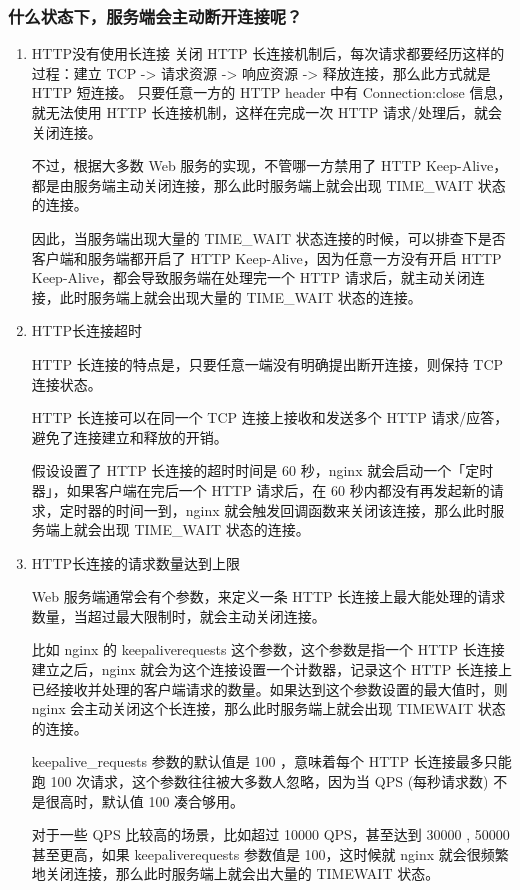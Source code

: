 \documentclass[11pt]{article}
\begin{document}
\subsubsection{什么状态下，服务端会主动断开连接呢？}
\label{sec:org2417e2a}
\begin{enumerate}
\item HTTP没有使用长连接
关闭 HTTP 长连接机制后，每次请求都要经历这样的过程：建立 TCP -> 请求资源 -> 响应资源 -> 释放连接，那么此方式就是 HTTP 短连接。
只要任意一方的 HTTP header 中有 Connection:close 信息，就无法使用 HTTP 长连接机制，这样在完成一次 HTTP 请求/处理后，就会关闭连接。

不过，根据大多数 Web 服务的实现，不管哪一方禁用了 HTTP Keep-Alive，都是由服务端主动关闭连接，那么此时服务端上就会出现 TIME\_WAIT 状态的连接。

因此，当服务端出现大量的 TIME\_WAIT 状态连接的时候，可以排查下是否客户端和服务端都开启了 HTTP Keep-Alive，因为任意一方没有开启 HTTP Keep-Alive，都会导致服务端在处理完一个 HTTP 请求后，就主动关闭连接，此时服务端上就会出现大量的 TIME\_WAIT 状态的连接。

\item HTTP长连接超时

HTTP 长连接的特点是，只要任意一端没有明确提出断开连接，则保持 TCP 连接状态。

HTTP 长连接可以在同一个 TCP 连接上接收和发送多个 HTTP 请求/应答，避免了连接建立和释放的开销。

假设设置了 HTTP 长连接的超时时间是 60 秒，nginx 就会启动一个「定时器」，如果客户端在完后一个 HTTP 请求后，在 60 秒内都没有再发起新的请求，定时器的时间一到，nginx 就会触发回调函数来关闭该连接，那么此时服务端上就会出现 TIME\_WAIT 状态的连接。

\item HTTP长连接的请求数量达到上限

Web 服务端通常会有个参数，来定义一条 HTTP 长连接上最大能处理的请求数量，当超过最大限制时，就会主动关闭连接。

比如 nginx 的 keepaliverequests 这个参数，这个参数是指一个 HTTP 长连接建立之后，nginx 就会为这个连接设置一个计数器，记录这个 HTTP 长连接上已经接收并处理的客户端请求的数量。如果达到这个参数设置的最大值时，则 nginx 会主动关闭这个长连接，那么此时服务端上就会出现 TIMEWAIT 状态的连接。

keepalive\_requests 参数的默认值是 100 ，意味着每个 HTTP 长连接最多只能跑 100 次请求，这个参数往往被大多数人忽略，因为当 QPS (每秒请求数) 不是很高时，默认值 100 凑合够用。

对于一些 QPS 比较高的场景，比如超过 10000 QPS，甚至达到 30000 , 50000 甚至更高，如果 keepaliverequests 参数值是 100，这时候就 nginx 就会很频繁地关闭连接，那么此时服务端上就会出大量的 TIMEWAIT 状态。
\end{enumerate}
\end{document}
